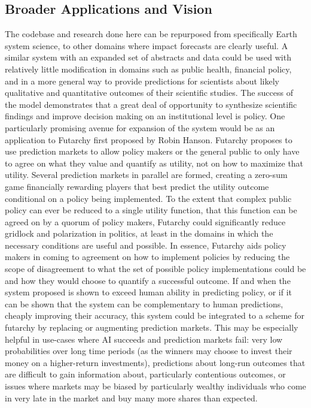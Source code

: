 \documentclass[12pt,a4paper]{article}
\begin{document}
\subsection{Broader Applications and Vision}
The codebase and research done here can be repurposed from specifically Earth system science, to other domains where impact forecasts are clearly useful. A similar system with an expanded set of abstracts and data could be used with relatively little modification in domains such as public health, financial policy, and in a more general way to provide predictions for scientists about likely qualitative and quantitative outcomes of their scientific studies. The success of the model demonstrates that a great deal of opportunity to synthesize scientific findings and improve decision making on an institutional level is policy.
One particularly promising avenue for expansion of the system would be as an application to Futarchy first proposed by Robin Hanson. Futarchy proposes to use prediction markets to allow policy makers or the general public to only have to agree on what they value and quantify as utility, not on how to maximize that utility. Several prediction markets in parallel are formed, creating a zero-sum game financially rewarding players that best predict the utility outcome conditional on a policy being implemented. To the extent that complex public policy can ever be reduced to a single utility function, that this function can be agreed on by a quorum of policy makers, Futarchy could significantly reduce gridlock and polarization in politics, at least in the domains in which the necessary conditions are useful and possible. In essence, Futarchy aids policy makers in coming to agreement on how to implement policies by reducing the scope of disagreement to what the set of possible policy implementations could be and how they would choose to quantify a successful outcome.
If and when the system proposed is shown to exceed human ability in predicting policy, or if it can be shown that the system can be complementary to human predictions, cheaply improving their accuracy, this system could be integrated to a scheme for futarchy by replacing or augmenting prediction markets. This may be especially helpful in use-cases where AI succeeds and prediction markets fail: very low probabilities over long time periods (as the winners may choose to invest their money on a higher-return investments), predictions about long-run outcomes that are difficult to gain information about, particularly contentious outcomes, or issues where markets may be biased by particularly wealthy individuals who come in very late in the market and buy many more shares than expected.
\end{document}
